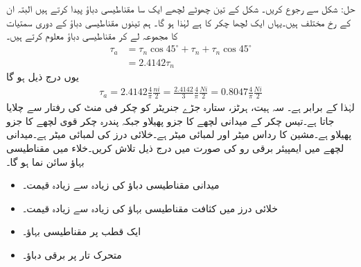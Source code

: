 حل: \quad
شکل   سے رجوع کریں۔ شکل  کے تین چھوٹے لچھے ایک سا مقناطیسی دباؤ  پیدا کرتے ہیں البتہ ان کے رخ مختلف ہیں۔یہاں ایک لچھا   چکر کا ہے لہٰذا  ہو گا۔ ہم تینوں مقناطیسی دباؤ کے دوری سمتیات کا مجموعہ لے کر  مقناطیسی دباؤ  معلوم کرتے ہیں۔
\begin{align*}
\tau_a&=\tau_n \cos 45^{\circ}+\tau_n+\tau_n \cos 45^{\circ}\\
&=2.4142 \tau_n
\end{align*}
یوں درج ذیل ہو گا
\begin{align*}
\tau_a=2.4142 \frac{4}{\pi}\frac{ni}{2}=\frac{2.4142}{3} \frac{4}{\pi}\frac{N i}{2}=0.8047 \frac{4}{\pi}\frac{N i}{2}
\end{align*}
لہٰذا  کے برابر ہے۔
%
سہ ہیت،  ہرٹز، ستارہ جڑے جنریٹر کو   چکر فی منٹ کی رفتار سے چلایا جاتا ہے۔تیس چکر کے میدانی لچھے  کا جزو پھیلاو  جبکہ پندرہ چکر قوی لچھے کا جزو پھیلاو  ہے۔مشین کا رداس  میٹر اور لمبائی  میٹر ہے۔خلائی درز کی لمبائی  میٹر ہے۔میدانی لچھے میں   ایمپیئر برقی رو کی صورت میں درج ذیل تلاش کریں۔خلاء میں مقناطیسی بہاؤ سائن نما ہو گا۔ 
\begin{itemize}
\item
میدانی مقناطیسی دباؤ کی زیادہ سے زیادہ قیمت۔
\item
خلائی درز میں کثافت مقناطیسی بہاؤ کی زیادہ سے زیادہ قیمت۔
\item
ایک قطب پر مقناطیسی بہاؤ۔
\item
متحرک تار پر برقی دباؤ۔
\end{itemize}

